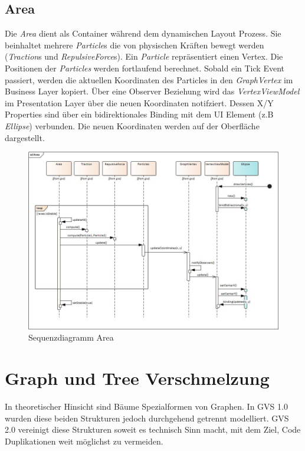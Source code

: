 \documentclass[11pt,a4paper,english,oneside]{book}
\numberwithin{equation}{chapter}
\begin{document}
	\subsection{Area} \label{ssec:area}
	Die \textit{Area} dient als Container während dem dynamischen Layout Prozess. Sie beinhaltet mehrere \textit{Particle}s die von physischen Kräften bewegt werden (\textit{Traction}s und \textit{RepulsiveForce}s). Ein \textit{Particle} repräsentiert einen Vertex. Die Positionen der \textit{Particles} werden fortlaufend berechnet. Sobald ein Tick Event passiert, werden die aktuellen Koordinaten des Particles in den \textit{GraphVertex} im Business Layer kopiert. 	Über eine Observer Beziehung wird das \textit{VertexViewModel} im Presentation Layer über die neuen Koordinaten notifziert. Dessen X/Y Properties sind über ein bidirektionales Binding mit dem UI Element (z.B \textit{Ellipse}) verbunden. Die neuen Koordinaten werden auf der Oberfläche dargestellt. 
	
	\begin{figure}[h!]
		\centering
		\includegraphics[width=\linewidth]{assets/images/sequence_area}
		\caption{Sequenzdiagramm Area}
		\label{fig:sequencearea}
	\end{figure}

	\clearpage

	\section{Graph und Tree Verschmelzung} \label{graph-vs-tree}
	In theoretischer Hinsicht sind Bäume Spezialformen von Graphen. In GVS 1.0 wurden diese beiden Strukturen jedoch durchgehend getrennt modelliert. GVS 2.0 vereinigt diese Strukturen soweit es technisch Sinn macht, mit dem Ziel, Code Duplikationen weit möglichst zu vermeiden.
	
\end{document}

